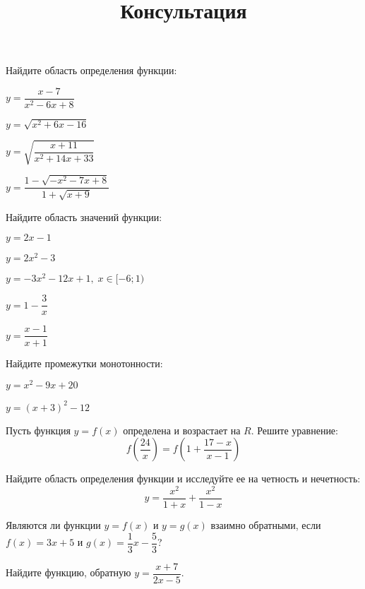 \begin{listofex}
	\item Найдите область определения функции:
	\begin{enumcols}[itemcolumns=2]
		\item \( y=\dfrac{x-7}{x^2-6x+8} \)
		\item \( y=\sqrt{x^2+6x-16} \)
		\item \( y=\sqrt{\dfrac{x+11}{x^2+14x+33}} \)
		\item \( y=\dfrac{1-\sqrt{-x^2-7x+8}}{1+\sqrt{x+9}} \)
	\end{enumcols}
	\item Найдите область значений функции:
	\begin{enumcols}[itemcolumns=2]
		\item \( y=2x-1 \)
		\item \( y=2x^2-3 \)
		\item \( y=-3x^2-12x+1,\;x\in[-6;1) \)
		\item \( y=1-\dfrac{3}{x} \)
		\item \( y=\dfrac{x-1}{x+1} \)
	\end{enumcols}
	\item Найдите промежутки монотонности:
	\begin{enumcols}[itemcolumns=2]
		\item \( y=x^2-9x+20 \)
		\item \( y=(x+3)^2-12 \)
	\end{enumcols}
	\item Пусть функция \( y=f(x) \) определена и возрастает на \( R \). Решите уравнение: \[ f\left( \dfrac{24}{x} \right)=f\left( 1+\dfrac{17-x}{x-1} \right) \]
	\item Найдите область определения функции и исследуйте ее на четность и нечетность: \[ y=\dfrac{x^2}{1+x}+\dfrac{x^2}{1-x} \]
	\item Являются ли функции \( y=f(x) \) и \( y=g(x) \) взаимно обратными, если \( f(x)=3x+5 \) и \( g(x)=\dfrac{1}{3}x-\dfrac{5}{3} \)?
	\item Найдите функцию, обратную \( y=\dfrac{x+7}{2x-5} \).
\end{listofex}
\newpage
\title{Консультация}
